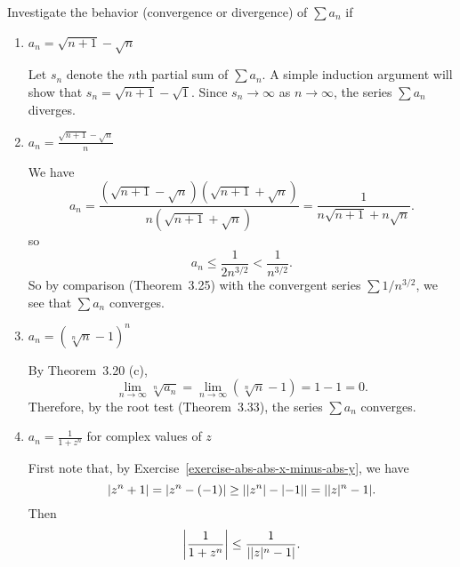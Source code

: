  Investigate the behavior (convergence or divergence) of
$\sum a_n$ if
\begin{enumerate}
\item $a_n = \sqrt{n+1} - \sqrt{n}$
  \begin{solution}
    Let $s_n$ denote the $n$th partial sum of $\sum a_n$. A simple
    induction argument will show that $s_n = \sqrt{n+1} -
    \sqrt1$. Since $s_n\to\infty$ as $n\to\infty$, the series
    $\sum a_n$ diverges.
  \end{solution}
\item $\displaystyle a_n = \frac{\sqrt{n+1} - \sqrt{n}}n$
  \begin{solution}
    We have
    \begin{equation*}
      a_n = \frac{(\sqrt{n+1} - \sqrt{n})(\sqrt{n+1} + \sqrt{n})}
            {n(\sqrt{n+1} + \sqrt{n})}
      = \frac1{n\sqrt{n+1} + n\sqrt{n}}.
    \end{equation*}
    so
    \begin{equation*}
      a_n \leq \frac1{2n^{3/2}} < \frac1{n^{3/2}}.
    \end{equation*}
    So by comparison (Theorem~3.25) with the convergent series
    $\sum1/n^{3/2}$, we see that $\sum a_n$ converges.
  \end{solution}
\item $a_n = (\sqrt[n]{n} - 1)^n$
  \begin{solution}
    By Theorem~3.20 (c),
    \begin{equation*}
      \lim_{n\to\infty}\sqrt[n]{a_n} = \lim_{n\to\infty}(\sqrt[n]{n} - 1)
      = 1 - 1 = 0.
    \end{equation*}
    Therefore, by the root test (Theorem~3.33), the series $\sum a_n$
    converges.
  \end{solution}
\item $\displaystyle a_n = \frac1{1+z^n}$ for complex values of $z$
  \begin{solution}
    First note that, by Exercise~\ref{exercise-abs-abs-x-minus-abs-y},
    we have
    \begin{equation*}
      \lvert{z^n + 1}\rvert = \lvert{z^n - (-1)}\rvert
      \geq \lvert{\lvert{z^n}\rvert - \lvert{-1}\rvert}\rvert
      = \lvert{\lvert{z}\rvert^n - 1}\rvert.
    \end{equation*}
    Then
    \begin{equation}
      \label{eq:abs-1-over-1-plus-z-n-inequality}
      \left\lvert{\frac1{1 + z^n}}\right\rvert \leq \frac1{\lvert{\lvert{z}\rvert^n - 1}\rvert}.
    \end{equation}


\end{solution}
\end{enumerate}
